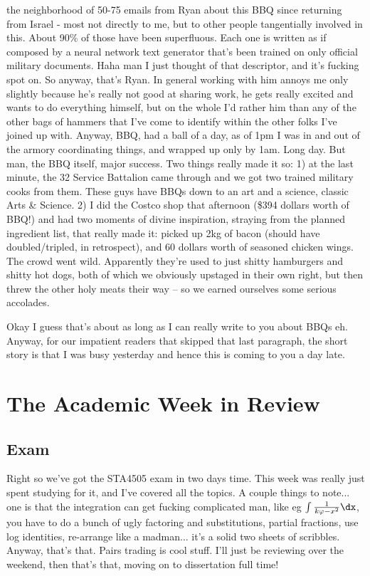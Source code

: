\documentclass[12pt]{article}
\begin{document}
the neighborhood of 50-75 emails from Ryan about this BBQ since returning from Israel - most not directly to me, but to other people tangentially involved in this. About 90\% of those have been superfluous. Each one is written as if composed by a neural network text generator that's been trained on only official military documents. Haha man I just thought of that descriptor, and it's fucking spot on. So anyway, that's Ryan. In general working with him annoys me only slightly because he's really not good at sharing work, he gets really excited and wants to do everything himself, but on the whole I'd rather him than any of the other bags of hammers that I've come to identify within the other folks I've joined up with. Anyway, BBQ, had a ball of a day, as of 1pm I was in and out of the armory coordinating things, and wrapped up only by 1am. Long day. But man, the BBQ itself, major success. Two things really made it so: 1) at the last minute, the 32 Service Battalion came through and we got two trained military cooks from them. These guys have BBQs down to an art and a science, classic Arts \& Science. 2) I did the Costco shop that afternoon (\$394 dollars worth of BBQ!) and had two moments of divine inspiration, straying from the planned ingredient list, that really made it: picked up 2kg of bacon (should have doubled/tripled, in retrospect), and 60 dollars worth of seasoned chicken wings. The crowd went wild. Apparently they're used to just shitty hamburgers and shitty hot dogs, both of which we obviously upstaged in their own right, but then threw the other holy meats their way -- so we earned ourselves some serious accolades. 

Okay I guess that's about as long as I can really write to you about BBQs eh. Anyway, for our impatient readers that skipped that last paragraph, the short story is that I was busy yesterday and hence this is coming to you a day late. 

\section*{The Academic Week in Review}
\subsection*{Exam}
Right so we've got the STA4505 exam in two days time. This week was really just spent studying for it, and I've covered all the topics. A couple things to note... one is that the integration can get fucking complicated man, like eg $\int \frac{1}{k\varphi - x^2} \dx$, you have to do a bunch of ugly factoring and substitutions, partial fractions, use log identities, re-arrange like a madman... it's a solid two sheets of scribbles. Anyway, that's that. Pairs trading is cool stuff. I'll just be reviewing over the weekend, then that's that, moving on to dissertation full time!
\end{document}
